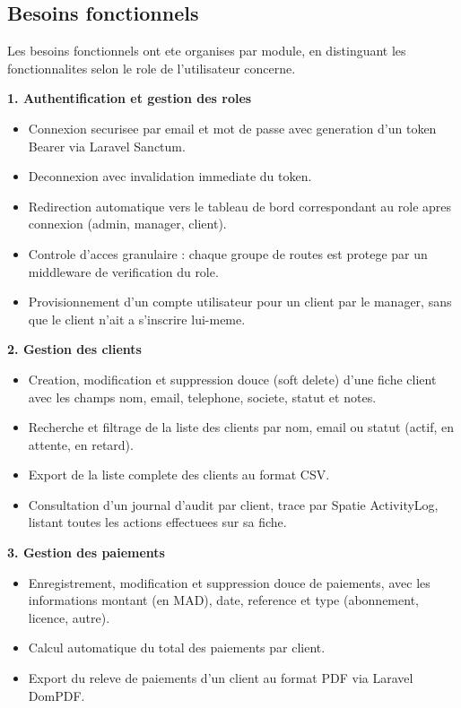 \documentclass[12pt, a4paper]{report}
\begin{document}
\subsection{Besoins fonctionnels}

Les besoins fonctionnels ont ete organises par module, en distinguant les
fonctionnalites selon le role de l'utilisateur concerne.

\vspace{0.3cm}
\textbf{1. Authentification et gestion des roles}

\begin{itemize}
  \item Connexion securisee par email et mot de passe avec generation d'un
        token Bearer via Laravel Sanctum.
  \item Deconnexion avec invalidation immediate du token.
  \item Redirection automatique vers le tableau de bord correspondant au role
        apres connexion (admin, manager, client).
  \item Controle d'acces granulaire : chaque groupe de routes est protege par
        un middleware de verification du role.
  \item Provisionnement d'un compte utilisateur pour un client par le manager,
        sans que le client n'ait a s'inscrire lui-meme.
\end{itemize}

\vspace{0.3cm}
\textbf{2. Gestion des clients}

\begin{itemize}
  \item Creation, modification et suppression douce (soft delete) d'une fiche
        client avec les champs nom, email, telephone, societe, statut et notes.
  \item Recherche et filtrage de la liste des clients par nom, email ou statut
        (actif, en attente, en retard).
  \item Export de la liste complete des clients au format CSV.
  \item Consultation d'un journal d'audit par client, trace par Spatie
        ActivityLog, listant toutes les actions effectuees sur sa fiche.
\end{itemize}

\vspace{0.3cm}
\textbf{3. Gestion des paiements}

\begin{itemize}
  \item Enregistrement, modification et suppression douce de paiements, avec
        les informations montant (en MAD), date, reference et type
        (abonnement, licence, autre).
  \item Calcul automatique du total des paiements par client.
  \item Export du releve de paiements d'un client au format PDF via
        Laravel DomPDF.
\end{itemize}
\end{document}
